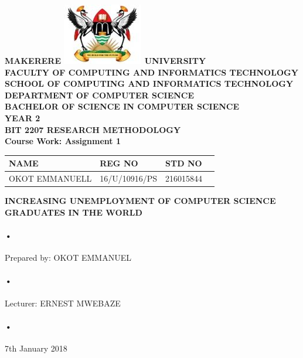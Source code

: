 \documentclass[12pt]{article}
\begin{document}
\begin{Huge}
\begin{center}
\begin{normalsize}
\textbf{MAKERERE \includegraphics[scale=0.5]{logo} UNIVERSITY }\\


\textbf{FACULTY OF COMPUTING AND INFORMATICS TECHNOLOGY} \\
\textbf{SCHOOL OF COMPUTING AND INFORMATICS TECHNOLOGY} \\
\textbf{DEPARTMENT OF COMPUTER SCIENCE} \\
\textbf{BACHELOR OF SCIENCE IN COMPUTER SCIENCE} \\
\textbf{YEAR 2} \\
\textbf{BIT 2207 RESEARCH METHODOLOGY} \\
\textbf{Course Work: Assignment 1}\\
\end{normalsize}
\end{center}
\end{Huge}

\begin{center}
\begin{tabular}{|l|l|l|c|}
\hline NAME  & REG NO & STD NO \\\hline
OKOT EMMANUELL& 16/U/10916/PS & 216015844 \\\hline
\end{tabular}

\end{center}

\newpage

\begin{center}
\textbf{INCREASING UNEMPLOYMENT OF COMPUTER SCIENCE GRADUATES IN THE WORLD}\\
\paragraph{•}
Prepared by: OKOT EMMANUEL\\
\paragraph{•}
Lecturer: ERNEST MWEBAZE \\
\paragraph{•}
7th January 2018

\end{center}
\end{document}
